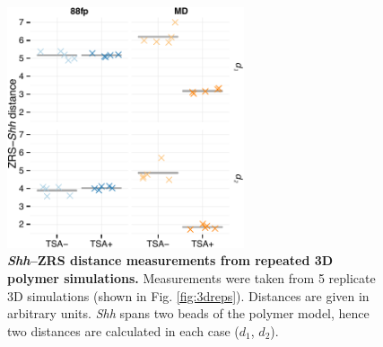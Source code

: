 \documentclass[a4paper,11pt,oneside]{book}
\begin{document}
\begin{figure}
\begin{center} 
\includegraphics[width=2.75in]{figs/3d_dists.pdf}
\captionsetup{width=\textwidth} 
\caption[ \emph{Shh}--ZRS distance measurements from repeated 3D polymer simulations. ]{ {\bf \emph{Shh}--ZRS distance measurements from repeated 3D polymer simulations. }
Measurements were taken from 5 replicate 3D simulations (shown in Fig. \ref{fig:3dreps}). Distances are given in arbitrary units. \emph{Shh} spans two beads of the polymer model, hence two distances are calculated in each case ($d_1$, $d_2$).
}\label{fig:3ddist}
\end{center} 
\end{figure} 
\end{document}
